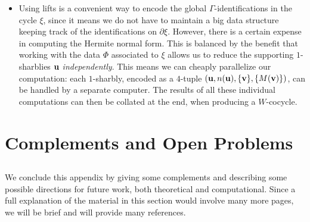 \begin{itemize}
Here are some numbers to give an idea of the size of these
computations.  For level $73$, the rank of $H^{5}$ is 20.  There are
39504 cells of codimension~$1$ and 4128 top-dimensional cells in $W$
modulo $\Gamma_{0} (73)$.  The computational techniques in
\cite{computation} used at this level (a Lanczos scheme over a large
finite field) tend to produce sharbly cycles supported on almost all
the cells.  Computing $T (2,1)$ requires a reduction tree of 
depth $1$
and produces as many as 26 reduced $1$-sharblies for each of the 15
nonreduced Hecke images.  Thus one cycle produces a cycle supported on
as many as 15406560 $1$-sharblies, all of which must be converted to
an appropriate cell of $W$ modulo $\Gamma$.  Also this is just what
needs to be done for \emph{one} cycle; do not forget that the rank of
$H^{5}$ is 20.

In practice the numbers are slightly better, since the reduction step
produces fewer $1$-sharblies on average and since the support of the
initial cycle has size less than $39504$.  Nevertheless the orders of
magnitude are correct.  

\item Using lifts is a convenient way to encode the global
$\Gamma$-identifications in the cycle $\xi$, since it means we do not
have to maintain a big data structure keeping track of the identifications on
$\partial \xi$.  However, there is a certain expense in computing the
Hermite normal form.  This is balanced by the benefit that working
with the data $\Phi$ associated to $\xi$ allows us to reduce the
supporting $1$-sharblies ${\mathbf {u}}$ \emph{independently}.  This means we
can cheaply parallelize our computation: each $1$-sharbly, encoded as
a $4$-tuple $({\mathbf {u}} , n ({\mathbf {u}} ), \{{\mathbf {v}} \}, \{M ({\mathbf {v}} ) \})$, can be
handled by a separate computer.  The results of all these individual
computations can then be collated at the end, when producing a
$W$-cocycle.
\end{itemize}


\section{Complements and Open Problems}\label{apps}

\subsection{}
%
We conclude this appendix by giving some complements and describing
some possible directions for future work, both theoretical and
computational.  Since a full explanation of the material in this
section would involve many more pages, we will be brief and will
provide many references.

